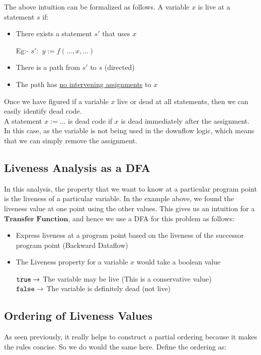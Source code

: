 \vspace{0.3cm}
The above intuition can be formalized as follows. A variable $x$ is live at a statement $s$ if:
\begin{itemize}
    \item There exists a statement $s'$ that uses $x$
    
    Eg:- $s':$ $y := f(...,x,...)$
    \item There is a path from $s'$ to $s$ (directed)
    \item The path has \underline{no intervening assignments} to $x$
\end{itemize}

Once we have figured if a variable $x$ live or dead at all statements, then we can easily identify dead code.\\
A statement $x := ...$ is dead code if $x$ is dead immediately after the assignment.
In this case, as the variable is not being used in the downflow logic, which means that we can simply remove the assignment.

\subsection{Liveness Analysis as a DFA}
In this analysis, the property that we want to know at a particular program point is the liveness of a particular variable. In the example above, we found the liveness value at one point using the other values.
This gives us an intuition for a $\textbf{Transfer Function}$, and hence we use a DFA for this problem as follows:
\begin{itemize}
    \item Express liveness at a program point based on the liveness of the successor program point (Backward Dataflow)
    \item The Liveness property for a variable $x$ would take a boolean value
    
    \hspace*{0.1 in}${\tt true} \rightarrow$ The variable may be live (This is a conservative value)\\ 
    \hspace*{0.1 in}${\tt false} \rightarrow$ The variable is definitely dead (not live)
\end{itemize}

\subsection{Ordering of Liveness Values}
As seen previously, it really helps to construct a partial ordering because it makes the rules concise. So we do would the same here. Define the ordering as:

